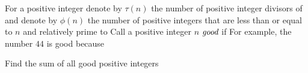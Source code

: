 For a positive integer  denote by $\tau(n)$ the number of positive integer divisors of  and denote by $\phi(n)$ the number of positive integers that are less than or equal to $n$ and relatively prime to  Call a positive integer $n$ $\emph{good}$ if  For example, the number $44$ is good because 

Find the sum of all good positive integers 